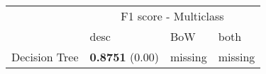 \begin{tabular}{|l|l|l|l| }
\hline
 &  \multicolumn{3}{c|}{ F1 score - Multiclass} \\
\cline{2-4} & desc & BoW & both \\ \hline
Decision Tree & {\bf 0.8751} (0.00) & missing  & missing \\
\hline
\end{tabular}